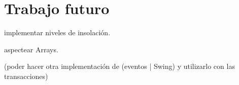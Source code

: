 
\section{Trabajo futuro}
\label{sec:futurework}

implementar niveles de insolación.

aspectear Arrays.

(poder hacer otra implementación de (eventos | Swing) y utilizarlo con las
transacciones)

